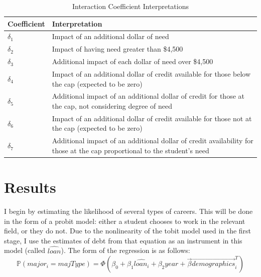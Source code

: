 \documentclass[12pt]{article}
\begin{document}
	\begin{table}
		\centering
		\caption{Interaction Coefficient Interpretations}		
		\begin{tabular}{lp{8cm}}
			\toprule
			Coefficient & Interpretation\\
			\midrule
			$\delta_1$ & Impact of an additional dollar of need\\
			$\delta_2$ & Impact of having need greater than \$4,500 \\
			$\delta_3$ & Additional impact of each dollar of need over \$4,500 \\
			$\delta_4$ & Impact of an additional dollar of credit available for those below the cap (expected to be zero)\\
			$\delta_5$ & Additional impact of an additional dollar of credit for those at the cap, not considering degree of need\\
			$\delta_6$ & Impact of an additional dollar of credit available for those not at the cap (expected to be zero)\\
			$\delta_7$ & Additional impact of an additional dollar of credit availability for those at the cap proportional to the student's need \\
			\bottomrule
		\end{tabular}
	
		\label{coefInterp}
	\end{table}
	
	
	\section{Results}
	
	I begin by estimating the likelihood of several types of careers. This will be done in the form of a probit model: either a student chooses to work in the relevant field, or they do not. Due to the nonlinearity of the tobit model used in the first stage, I use the estimates of debt from that equation as an instrument in this model (called $\hat{loan}$). The form of the regression is as follows: 
	\begin{equation}
	\mathbb{P}\left(major_i = majType\right) = \Phi\left(\beta_0 + \beta_1 \hat{loan_i} + \beta_2 year + \vec{\beta}\vec{demographics}^T_i\right)
	\end{equation}
	
\end{document}

